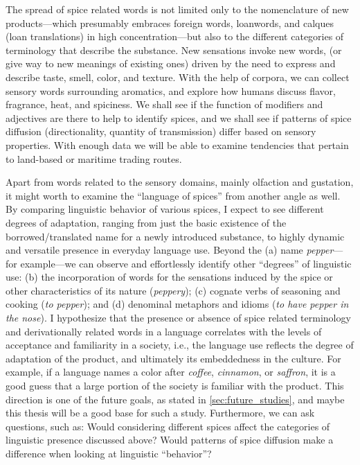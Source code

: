 The spread of spice related words is not limited only to the nomenclature of new products---which presumably embraces foreign words, loanwords, and calques (loan translations) in high concentration---but also to the different categories of terminology that describe the substance. New sensations invoke new words, (or give way to new meanings of existing ones) driven by the need to express and describe taste, smell, color, and texture. With the help of corpora, we can collect sensory words surrounding aromatics, and explore how humans discuss flavor, fragrance, heat, and spiciness. We shall see if the function of modifiers and adjectives are there to help to identify spices, and we shall see if patterns of spice diffusion (directionality, quantity of transmission) differ based on sensory properties. With enough data we will be able to examine tendencies that pertain to land-based or maritime trading routes.

Apart from words related to the sensory domains, mainly olfaction and gustation, it might worth to examine the ``language of spices'' from another angle as well. By comparing linguistic behavior of various spices, I expect to see different degrees of adaptation, ranging from just the basic existence of the borrowed/translated name for a newly introduced substance, to highly dynamic and versatile presence in everyday language use. Beyond the (a) name \textit{pepper}---for example---we can observe and effortlessly identify other ``degrees'' of linguistic use: (b) the incorporation of words for the sensations induced by the spice or other characteristics of its nature (\textit{peppery}); (c) cognate verbs of seasoning and cooking (\textit{to pepper}); and (d) denominal metaphors and idioms (\textit{to have pepper in the nose}). I hypothesize that the presence or absence of spice related terminology and derivationally related words in a language correlates with the levels of acceptance and familiarity in a society, i.e., the language use reflects the degree of adaptation of the product, and ultimately its embeddedness in the culture. For example, if a language names a color after \textit{coffee}, \textit{cinnamon}, or \textit{saffron}, it is a good guess that a large portion of the society is familiar with the product. This direction is one of the future goals, as stated in \cref{sec:future_studies}, and maybe this thesis will be a good base for such a study. Furthermore, we can ask questions, such as: Would considering different spices affect the categories of linguistic presence discussed above? Would patterns of spice diffusion make a difference when looking at linguistic ``behavior''?

